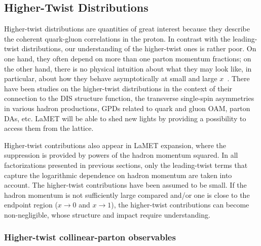 \documentclass[aps,rmp,reprint,amsmath,amssymb,graphicx,longbibliography]{revtex4-1} %
\begin{document}
\subsection{Higher-Twist Distributions}
\label{sec:others-ht}

Higher-twist distributions are quantities of great interest because they describe the coherent quark-gluon correlations in
the proton. In contrast with the leading-twist distributions, our understanding of the higher-twist ones is rather poor.
On one hand, they often depend on more than one parton momentum fractions; on the other hand, there is no physical intuition about what they may look like, in particular, about how they behave asymptotically at small and large $x$~\cite{Braun:2011aw}. There have been studies on the higher-twist distributions in the context of their connection to the DIS structure function, the transverse single-spin asymmetries in various hadron productions, GPDs related to quark and gluon OAM, parton DAs, etc. LaMET will be able to shed new lights by providing a possibility to access them from the lattice.

Higher-twist contributions also appear in LaMET expansion, where
the suppression is provided by powers of the hadron momentum squared.
In all factorizations presented in previous sections, only the leading-twist terms that capture the logarithmic dependence on hadron momentum are taken into account. The higher-twist contributions have been assumed to be small. If the hadron momentum is not sufficiently large compared and/or one is close to the endpoint region ($x\to0$ and $x\to1$), the higher-twist contributions can become non-negligible, whose structure and impact require understanding.


\subsubsection{Higher-twist collinear-parton observables}
\end{document}

